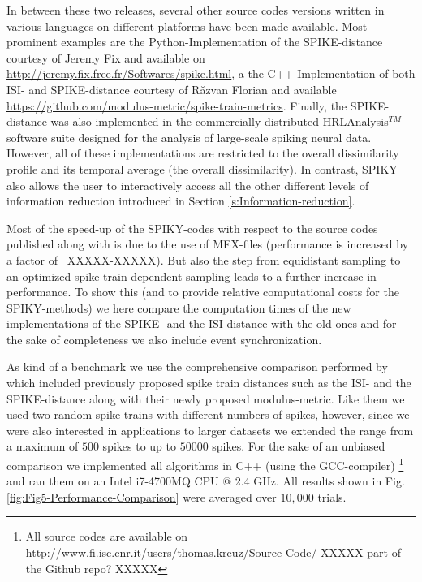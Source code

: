 \documentclass[10pt,twocolumn]{elsart5p}
\begin{document}
In between these two releases, several other source codes versions written in various languages on different platforms have been made available. Most prominent examples are the Python-Implementation of the SPIKE-distance courtesy of Jeremy Fix and available on \url{http://jeremy.fix.free.fr/Softwares/spike.html}, a the C++-Implementation of both ISI- and SPIKE-distance courtesy of R{\v a}zvan Florian and available \url{https://github.com/modulus-metric/spike-train-metrics}. Finally, the SPIKE-distance was also implemented in the commercially distributed HRLAnalysis$^{TM}$ software suite \citep{Thibeault14} designed for the analysis of large-scale spiking neural data. However, all of these implementations are restricted to the overall dissimilarity profile and its temporal average (the overall dissimilarity). In contrast, SPIKY also allows the user to interactively access all the other different levels of information reduction introduced in Section \ref{s:Information-reduction}.

Most of the speed-up of the SPIKY-codes with respect to the source codes published along with \citet{Kreuz13} is due to the use of MEX-files (performance is increased by a factor of ~XXXXX-XXXXX). But also the step from equidistant sampling to an optimized spike train-dependent sampling leads to a further increase in performance. To show this (and to provide relative computational costs for the SPIKY-methods) we here compare the computation times of the new implementations of the SPIKE- and the ISI-distance with the old ones and for the sake of completeness we also include event synchronization.

As kind of a benchmark we use the comprehensive comparison performed by \cite{Rusu14} which included previously proposed spike train distances such as the ISI- and the SPIKE-distance along with their newly proposed modulus-metric. Like them we used two random spike trains with different numbers of spikes, however, since we were also interested in applications to larger datasets we extended the range from a maximum of $500$ spikes to up to $50000$ spikes. For the sake of an unbiased comparison we implemented all algorithms in C++ (using the GCC-compiler) \footnote{All source codes are available on \url{http://www.fi.isc.cnr.it/users/thomas.kreuz/Source-Code/} XXXXX part of the Github repo? XXXXX} and ran them on an Intel i7-4700MQ CPU @ 2.4 GHz. All results shown in Fig. \ref{fig:Fig5-Performance-Comparison} were averaged over $10,000$ trials.
\end{document}

